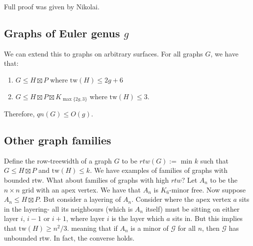 \documentclass[]{article}
\newcommand{\tw}{\text{tw}}
\theoremstyle{definition}
\numberwithin{theorem}{section}
\numberwithin{equation}{section}
\begin{document}
Full proof was given by Nikolai.
\subsection{Graphs of Euler genus $g$}
We can extend this to graphs on arbitrary surfaces. For all graphs $G$, we have that:
\begin{enumerate}
	\item $G \leq H \boxtimes P$ where $\tw(H) \leq 2g + 6$
	\item $G \leq H \boxtimes P \boxtimes K_{\max\{2g, 3\} }$ where $\tw(H) \leq 3$. 
\end{enumerate}
Therefore, $qn(G) \leq O(g)$. 

\subsection{Other graph families}
Define the row-treewidth of a graph $G$ to be $rtw(G) := $ min $k$ such that $G \leq H \boxtimes P$ and $\tw(H) \leq k$. We have examples of families of graphs with bounded rtw.
What about families of graphs with high $rtw$?
Let $A_n$ to be the $n \times n$ grid with an apex vertex. We have that $A_n$ is $K_6$-minor free. Now suppose $A_n \leq H \boxtimes P$. But consider a layering of $A_n$. Consider where the apex vertex $a$ sits in the layering- all its neighbours (which is $A_n$ itself) must be sitting on either layer $i$, $i-1$ or $i+1$, where layer $i$ is the layer which $a$ sits in. But this implies that $\tw(H) \geq n^2/3$. meaning that if $A_n$ is a minor of $\mathcal{G}$ for all $n$, then $\mathcal{G}$ has unbounded rtw. In fact, the converse holds. 
\end{document}
